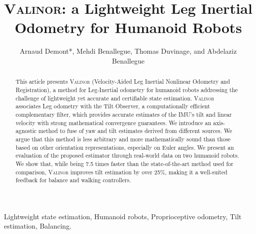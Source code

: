 \documentclass{IJCAS}
\begin{document}
\newcommand{\getErrorResult}[5]{\csname#1#2#3#4#5\endcsname}



\title{{\scshape Valinor}: a Lightweight Leg Inertial Odometry for Humanoid Robots}

\author{Arnaud Demont*, Mehdi Benallegue, Thomas Duvinage, and Abdelaziz Benallegue}


\begin{abstract}
This article presents {\scshape Valinor} (Velocity-Aided Leg Inertial Nonlinear Odometry and Registration), a method for Leg-Inertial odometry for humanoid robots addressing the challenge of lightweight yet accurate and certifiable state estimation. {\scshape Valinor} associates Leg odometry with the Tilt Observer, a computationally efficient complementary filter, which provides accurate estimates of the IMU's tilt and linear velocity with strong mathematical convergence guarantees. We introduce an axis-agnostic method to fuse of yaw and tilt estimates derived from different sources. We argue that this method is less arbitrary and more mathematically sound than those based on other orientation representations, especially on Euler angles.
We present an evaluation of the proposed estimator through real-world data on two humanoid robots. We show that, while being 7.5 times faster than the state-of-the-art method used for comparison, {\scshape Valinor} improves tilt estimation by over 25\%, making it a well-suited feedback for balance and walking controllers. 
\end{abstract}

\begin{keywords}
  Lightweight state estimation, Humanoid robots, Proprioceptive odometry, Tilt estimation, Balancing.
\end{keywords}

\maketitle


\end{document}
